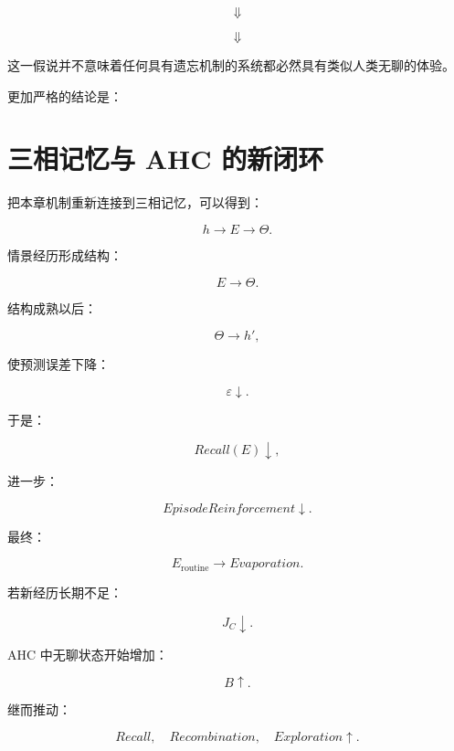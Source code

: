 \[
\Downarrow
\]

\begin{statementbox}
\centering
{}
\end{statementbox}

\[
\Downarrow
\]

\begin{statementbox}
\centering
{}
\end{statementbox}

这一假说并不意味着任何具有遗忘机制的系统都必然具有类似人类无聊的体验。

更加严格的结论是：

\begin{statementbox}
\centering
{}
\end{statementbox}

\section{三相记忆与 AHC 的新闭环}

把本章机制重新连接到三相记忆，可以得到：

\[
h
\rightarrow
E
\rightarrow
\Theta.
\]

情景经历形成结构：

\[
E\rightarrow\Theta.
\]

结构成熟以后：

\[
\Theta\rightarrow h',
\]

使预测误差下降：

\[
\varepsilon\downarrow.
\]

于是：

\[
Recall(E)\downarrow,
\]

进一步：

\[
EpisodeReinforcement\downarrow.
\]

最终：

\[
E_{\mathrm{routine}}
\rightarrow
Evaporation.
\]

若新经历长期不足：

\[
J_C\downarrow.
\]

AHC 中无聊状态开始增加：

\[
B\uparrow.
\]

继而推动：

\[
Recall,
\quad
Recombination,
\quad
Exploration
\uparrow.
\]

